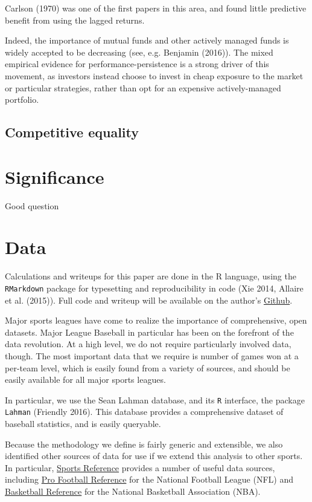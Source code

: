 \documentclass[11pt,]{article}
\begin{document}
Carlson (1970) was one of the first papers in this area, and found
little predictive benefit from using the lagged returns.

Indeed, the importance of mutual funds and other actively managed funds
is widely accepted to be decreasing (see, e.g. Benjamin (2016)). The
mixed empirical evidence for performance-persistence is a strong driver
of this movement, as investors instead choose to invest in cheap
exposure to the market or particular strategies, rather than opt for an
expensive actively-managed portfolio.

\subsection{Competitive equality}\label{competitive-equality}

\section{Significance}\label{significance}

Good question

\section{Data}\label{data}

Calculations and writeups for this paper are done in the R language,
using the \texttt{RMarkdown} package for typesetting and reproducibility
in code (Xie 2014, Allaire et al. (2015)). Full code and writeup will be
available on the author's
\href{https://github.com/stillmatic/thesis}{Github}.

Major sports leagues have come to realize the importance of
comprehensive, open datasets. Major League Baseball in particular has
been on the forefront of the data revolution. At a high level, we do not
require particularly involved data, though. The most important data that
we require is number of games won at a per-team level, which is easily
found from a variety of sources, and should be easily available for all
major sports leagues.

In particular, we use the Sean Lahman database, and its \texttt{R}
interface, the package \texttt{Lahman} (Friendly 2016). This database
provides a comprehensive dataset of baseball statistics, and is easily
queryable.

Because the methodology we define is fairly generic and extensible, we
also identified other sources of data for use if we extend this analysis
to other sports. In particular,
\href{http://www.sports-reference.com/}{Sports Reference} provides a
number of useful data sources, including
\href{http://www.pro-football-reference.com/}{Pro Football Reference}
for the National Football League (NFL) and
\href{http://www.basketball-reference.com/}{Basketball Reference} for
the National Basketball Association (NBA).
\end{document}
